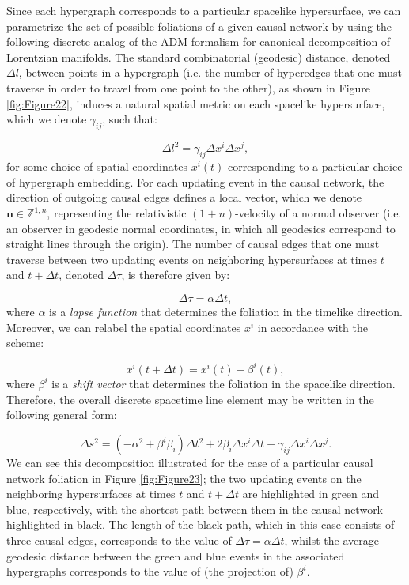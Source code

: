 \documentclass{article}
\begin{document}
Since each hypergraph corresponds to a particular spacelike hypersurface, we can parametrize the set of possible foliations of a given causal network by using the following discrete analog of the ADM formalism for canonical decomposition of Lorentzian manifolds\cite{arnowitt}\cite{misner}. The standard combinatorial (geodesic) distance, denoted ${\Delta l}$, between points in a hypergraph (i.e. the number of hyperedges that one must traverse in order to travel from one point to the other), as shown in Figure \ref{fig:Figure22}, induces a natural spatial metric on each spacelike hypersurface, which we denote ${\gamma_{i j}}$, such that:

\begin{equation}
\Delta l^2 = \gamma_{i j} \Delta x^{i} \Delta x^{j},
\end{equation}
for some choice of spatial coordinates ${x^{i} \left( t \right)}$ corresponding to a particular choice of hypergraph embedding. For each updating event in the causal network, the direction of outgoing causal edges defines a local vector, which we denote ${\mathbf{n} \in \mathbb{Z}^{1, n}}$, representing the relativistic ${\left( 1 + n \right)}$-velocity of a normal observer (i.e. an observer in geodesic normal coordinates, in which all geodesics correspond to straight lines through the origin). The number of causal edges that one must traverse between two updating events on neighboring hypersurfaces at times $t$ and ${t + \Delta t}$, denoted ${\Delta \tau}$, is therefore given by:

\begin{equation}
\Delta \tau = \alpha \Delta t,
\end{equation}
where ${\alpha}$ is a \textit{lapse function} that determines the foliation in the timelike direction. Moreover, we can relabel the spatial coordinates ${x^{i}}$ in accordance with the scheme:

\begin{equation}
x^{i} \left( t + \Delta t \right) = x^{i} \left( t \right) - \beta^{i} \left( t \right),
\end{equation}
where ${\beta^{i}}$ is a \textit{shift vector} that determines the foliation in the spacelike direction. Therefore, the overall discrete spacetime line element may be written in the following general form:

\begin{equation}
\Delta s^2 = \left( - \alpha^2 + \beta^{i} \beta_{i} \right) \Delta t^2 + 2 \beta_{i} \Delta x^{i} \Delta t + \gamma_{i j} \Delta x^{i} \Delta x^{j}.
\end{equation}
We can see this decomposition illustrated for the case of a particular causal network foliation in Figure \ref{fig:Figure23}; the two updating events on the neighboring hypersurfaces at times $t$ and ${t + \Delta t}$ are highlighted in green and blue, respectively, with the shortest path between them in the causal network highlighted in black. The length of the black path, which in this case consists of three causal edges, corresponds to the value of ${\Delta \tau = \alpha \Delta t}$, whilst the average geodesic distance between the green and blue events in the associated hypergraphs corresponds to the value of (the projection of) ${\beta^{i}}$.
\end{document}
